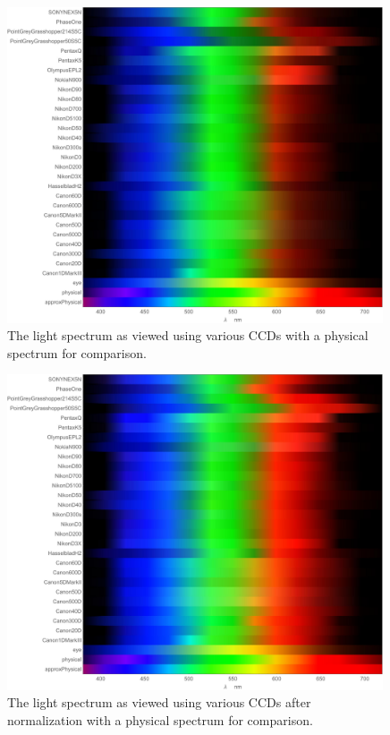 \begin{figure}[h!]
  \centering
    \includegraphics[width=0.99\textwidth]{Chapter1/Figs/ResponseSpectraStripes.jpg}
    \caption{The light spectrum as viewed using various CCDs with a physical spectrum for comparison.}  \label{fig:ResponseSpectraStripes}
\end{figure}

\clearpage

\begin{figure}[h!]
  \centering
    \includegraphics[width=0.99\textwidth]{Chapter1/Figs/ResponseSpectraStripesNorm.jpg}
    \caption{The light spectrum as viewed using various CCDs after normalization with a physical spectrum for comparison.}  \label{fig:ResponseSpectraStripesNorm}
\end{figure}

